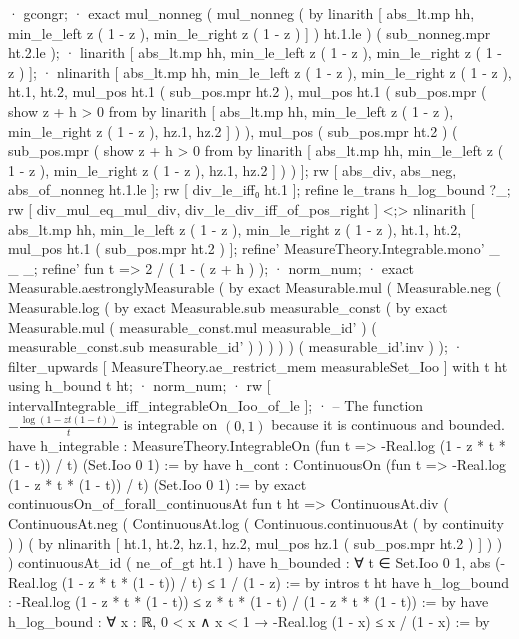               · gcongr;
                · exact mul_nonneg ( mul_nonneg ( by linarith [ abs_lt.mp hh, min_le_left z ( 1 - z ), min_le_right z ( 1 - z ) ] ) ht.1.le ) ( sub_nonneg.mpr ht.2.le );
                · linarith [ abs_lt.mp hh, min_le_left z ( 1 - z ), min_le_right z ( 1 - z ) ];
                · nlinarith [ abs_lt.mp hh, min_le_left z ( 1 - z ), min_le_right z ( 1 - z ), ht.1, ht.2, mul_pos ht.1 ( sub_pos.mpr ht.2 ), mul_pos ht.1 ( sub_pos.mpr ( show z + h > 0 from by linarith [ abs_lt.mp hh, min_le_left z ( 1 - z ), min_le_right z ( 1 - z ), hz.1, hz.2 ] ) ), mul_pos ( sub_pos.mpr ht.2 ) ( sub_pos.mpr ( show z + h > 0 from by linarith [ abs_lt.mp hh, min_le_left z ( 1 - z ), min_le_right z ( 1 - z ), hz.1, hz.2 ] ) ) ];
            rw [ abs_div, abs_neg, abs_of_nonneg ht.1.le ];
            rw [ div_le_iff₀ ht.1 ];
            refine le_trans h_log_bound ?_;
            rw [ div_mul_eq_mul_div, div_le_div_iff_of_pos_right ] <;> nlinarith [ abs_lt.mp hh, min_le_left z ( 1 - z ), min_le_right z ( 1 - z ), ht.1, ht.2, mul_pos ht.1 ( sub_pos.mpr ht.2 ) ];
          refine' MeasureTheory.Integrable.mono' _ _ _;
          refine' fun t => 2 / ( 1 - ( z + h ) );
          · norm_num;
          · exact Measurable.aestronglyMeasurable ( by exact Measurable.mul ( Measurable.neg ( Measurable.log ( by exact Measurable.sub measurable_const ( by exact Measurable.mul ( measurable_const.mul measurable_id' ) ( measurable_const.sub measurable_id' ) ) ) ) ) ( measurable_id'.inv ) );
          · filter_upwards [ MeasureTheory.ae_restrict_mem measurableSet_Ioo ] with t ht using h_bound t ht;
        · norm_num;
      · rw [ intervalIntegrable_iff_integrableOn_Ioo_of_le ];
        · -- The function $-\frac{\log(1 - z t (1 - t))}{t}$ is integrable on $(0, 1)$ because it is continuous and bounded.
          have h_integrable : MeasureTheory.IntegrableOn (fun t => -Real.log (1 - z * t * (1 - t)) / t) (Set.Ioo 0 1) := by
            have h_cont : ContinuousOn (fun t => -Real.log (1 - z * t * (1 - t)) / t) (Set.Ioo 0 1) := by
              exact continuousOn_of_forall_continuousAt fun t ht => ContinuousAt.div ( ContinuousAt.neg ( ContinuousAt.log ( Continuous.continuousAt ( by continuity ) ) ( by nlinarith [ ht.1, ht.2, hz.1, hz.2, mul_pos hz.1 ( sub_pos.mpr ht.2 ) ] ) ) ) continuousAt_id ( ne_of_gt ht.1 )
            have h_bounded : ∀ t ∈ Set.Ioo 0 1, abs (-Real.log (1 - z * t * (1 - t)) / t) ≤ 1 / (1 - z) := by
              intros t ht
              have h_log_bound : -Real.log (1 - z * t * (1 - t)) ≤ z * t * (1 - t) / (1 - z * t * (1 - t)) := by
                have h_log_bound : ∀ x : ℝ, 0 < x ∧ x < 1 → -Real.log (1 - x) ≤ x / (1 - x) := by
